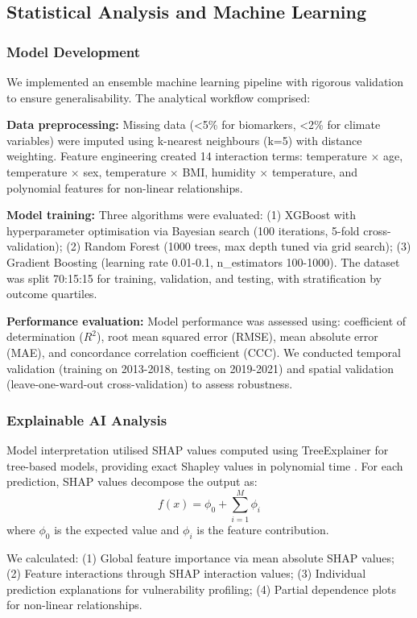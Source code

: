 \documentclass[11pt,a4paper]{article}
\begin{document}
\subsection{Statistical Analysis and Machine Learning}

\subsubsection{Model Development}

We implemented an ensemble machine learning pipeline with rigorous validation to ensure generalisability. The analytical workflow comprised:

\textbf{Data preprocessing:} Missing data (<5\% for biomarkers, <2\% for climate variables) were imputed using k-nearest neighbours (k=5) with distance weighting. Feature engineering created 14 interaction terms: temperature $\times$ age, temperature $\times$ sex, temperature $\times$ BMI, humidity $\times$ temperature, and polynomial features for non-linear relationships.

\textbf{Model training:} Three algorithms were evaluated: (1) XGBoost with hyperparameter optimisation via Bayesian search (100 iterations, 5-fold cross-validation); (2) Random Forest (1000 trees, max depth tuned via grid search); (3) Gradient Boosting (learning rate 0.01-0.1, n\_estimators 100-1000). The dataset was split 70:15:15 for training, validation, and testing, with stratification by outcome quartiles.

\textbf{Performance evaluation:} Model performance was assessed using: coefficient of determination ($R^2$), root mean squared error (RMSE), mean absolute error (MAE), and concordance correlation coefficient (CCC). We conducted temporal validation (training on 2013-2018, testing on 2019-2021) and spatial validation (leave-one-ward-out cross-validation) to assess robustness.

\subsubsection{Explainable AI Analysis}

Model interpretation utilised SHAP values computed using TreeExplainer for tree-based models, providing exact Shapley values in polynomial time \citep{Lundberg2020}. For each prediction, SHAP values decompose the output as:
$$f(x) = \phi_0 + \sum_{i=1}^{M} \phi_i$$
where $\phi_0$ is the expected value and $\phi_i$ is the feature contribution.

We calculated: (1) Global feature importance via mean absolute SHAP values; (2) Feature interactions through SHAP interaction values; (3) Individual prediction explanations for vulnerability profiling; (4) Partial dependence plots for non-linear relationships.
\end{document}
